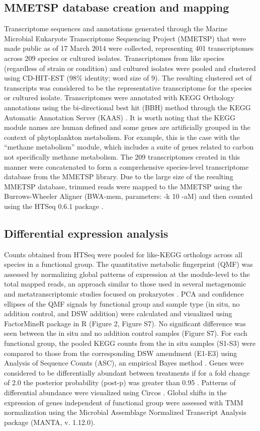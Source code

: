 \subsection{MMETSP database creation and mapping}
Transcriptome sequences and annotations generated through the Marine Microbial Eukaryote Transcriptome Sequencing Project (MMETSP) that were made public as of 17 March 2014 were collected, representing 401 transcriptomes across 209 species or cultured isolates. Transcriptomes from like species (regardless of strain or condition) and cultured isolates were pooled and clustered using CD-HIT-EST (98\% identity; word size of 9). The resulting clustered set of transcripts was considered to be the representative transcriptome for the species or cultured isolate. Transcriptomes were annotated with KEGG Orthology annotations using the bi-directional best hit (BBH) method through the KEGG Automatic Annotation Server (KAAS) \citep{Moriya2007}. It is worth noting that the KEGG module names are human defined and some genes are artificially grouped in the context of phytoplankton metabolism.  For example, this is the case with the “methane metabolism” module, which includes a suite of genes related to carbon not specifically methane metabolism. The 209 transcriptomes created in this manner were concatenated to form a comprehensive species-level transcriptome database from the MMETSP library. Due to the large size of the resulting MMETSP database, trimmed reads were mapped to the MMETSP using the Burrows-Wheeler Aligner \citep{Li2010} (BWA-mem, parameters: -k 10 -aM) and then counted using the HTSeq 0.6.1 package \citep{Anders2014}. \par
\subsection{Differential expression analysis}
Counts obtained from HTSeq were pooled for like-KEGG orthologs across all species in a functional group. The quantitative metabolic fingerprint (QMF) was assessed by normalizing global patterns of expression at the module-level to the total mapped reads, an approach similar to those used in several metagenomic and metatranscriptomic studies focused on prokaryotes \citep{Shi2011, Ottesen2014, Shi2012}. PCA and confidence ellipses of the QMF signals by functional group and sample type (in situ, no addition control, and DSW addition) were calculated and visualized using FactorMineR package in R (Figure 2, Figure S7). No significant difference was seen between the in situ and no addition control samples (Figure S7). For each functional group, the pooled KEGG counts from the in situ samples (S1-S3) were compared to those from the corresponding DSW amendment (E1-E3) using Analysis of Sequence Counts (ASC), an empirical Bayes method \citep{Wu2010}. Genes were considered to be differentially abundant between treatments if for a fold change of 2.0 the posterior probability (post-p) was greater than 0.95 \citep{Dyhrman2012}. Patterns of differential abundance were visualized using Circos \citep{Krzywinski2009}. Global shifts in the expression of genes independent of functional group were assessed with TMM normalization using the Microbial Assemblage Normalized Transcript Analysis package (MANTA, v. 1.12.0)\citep{Marchetti2012}. \par
